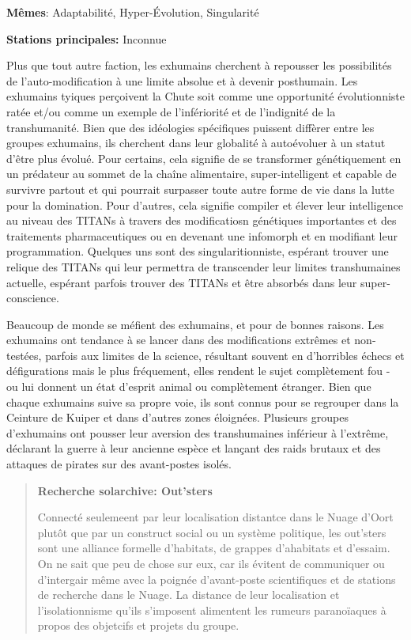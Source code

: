                                        \textbf{Mêmes}: Adaptabilité, Hyper-Évolution, Singularité 

                                       \textbf{Stations principales:} Inconnue 

                                       Plus que tout autre faction, les exhumains cherchent à repousser les possibilités de l'auto-modification à une limite absolue et à devenir posthumain. Les exhumains tyiques perçoivent la Chute soit comme une opportunité évolutionniste ratée et/ou comme un exemple de l'infériorité et de l'indignité de la transhumanité. Bien que des idéologies spécifiques puissent diffèrer entre les groupes exhumains, ils cherchent dans leur globalité à autoévoluer à un statut d'être plus évolué. Pour certains, cela signifie de se transformer génétiquement en un prédateur au sommet de la chaîne alimentaire, super-intelligent et capable de survivre partout et qui pourrait surpasser toute autre forme de vie dans la lutte pour la domination. Pour d'autres, cela signifie compiler et élever leur intelligence au niveau des TITANs à travers des modificatiosn génétiques importantes et des traitements pharmaceutiques ou en devenant une infomorph et en modifiant leur programmation. Quelques uns sont des singularitionniste, espérant trouver une relique des TITANs qui leur permettra de transcender leur limites transhumaines actuelle, espérant parfois trouver des TITANs et être absorbés dans leur super-conscience. 

                                       Beaucoup de monde se méfient des exhumains, et pour de bonnes raisons. Les exhumains ont tendance à se lancer dans des modifications extrêmes et non-testées, parfois aux limites de la science, résultant souvent en d'horribles échecs et défigurations mais le plus fréquement, elles rendent le sujet complètement fou - ou lui donnent un état d'esprit animal ou complètement étranger. Bien que chaque exhumains suive sa propre voie, ils sont connus pour se regrouper dans la Ceinture de Kuiper et dans d'autres zones éloignées. Plusieurs groupes d'exhumains ont pousser leur aversion des transhumaines inférieur à l'extrême, déclarant la guerre à leur ancienne espèce et lançant des raids brutaux et des attaques de pirates sur des avant-postes isolés. 

                                       \begin{quotation} \textbf{Recherche solarchive: Out'sters} 

                                          Connecté seulemeent par leur localisation distantce dans le Nuage d'Oort plutôt que par un construct social ou un système politique, les out'sters sont une alliance formelle d'habitats, de grappes d'ahabitats et d'essaim. On ne sait que peu de chose sur eux, car ils évitent de communiquer ou d'intergair même avec la poignée d'avant-poste scientifiques et de stations de recherche dans le Nuage. La distance de leur localisation et l'isolationnisme qu'ils s'imposent alimentent les rumeurs paranoïaques à propos des objetcifs et projets du groupe. \end{quotation} 

